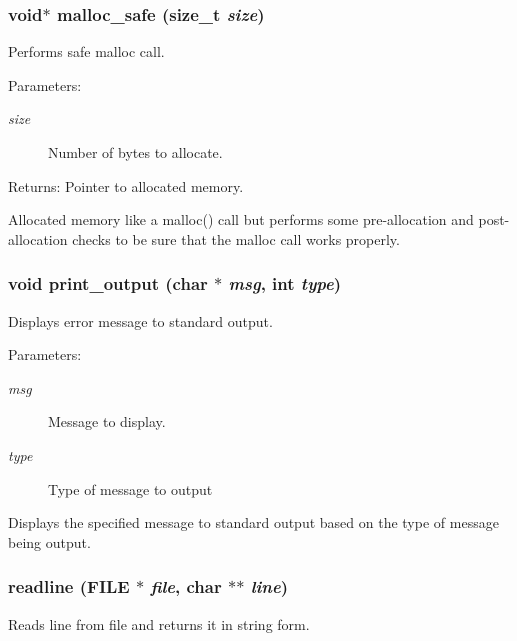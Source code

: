 \subsubsection{\setlength{\rightskip}{0pt plus 5cm}void$\ast$ malloc\_\-safe (size\_\-t {\em size})}\label{util_8h_a14}


Performs safe malloc call. 

\begin{Desc}
\item[Parameters:]
\begin{description}
\item[{\em size}]Number of bytes to allocate.\end{description}
\end{Desc}
\begin{Desc}
\item[Returns:]Pointer to allocated memory.\end{Desc}
Allocated memory like a malloc() call but performs some pre-allocation and post-allocation checks to be sure that the malloc call works properly. 
\subsubsection{\setlength{\rightskip}{0pt plus 5cm}void print\_\-output (char $\ast$ {\em msg}, int {\em type})}\label{util_8h_a2}


Displays error message to standard output. 

\begin{Desc}
\item[Parameters:]
\begin{description}
\item[{\em msg}]Message to display. \item[{\em type}]Type of message to output\end{description}
\end{Desc}
Displays the specified message to standard output based on the type of message being output. 
\subsubsection{ readline (FILE $\ast$ {\em file}, char $\ast$$\ast$ {\em line})}\label{util_8h_a8}


Reads line from file and returns it in string form. 

